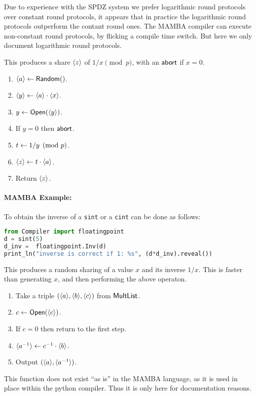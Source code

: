 Due to experience with the SPDZ system we prefer logarithmic
round protocols over constant round protocols, it appears that in
practice the logarithmic round protocols outperform the contant
round ones.
The MAMBA compiler can execute non-constant round protocols, by 
flicking a compile time switch. But here we only document
logarithmic round protocols.


This produces a share $\langle z \rangle$ of $1/x \pmod{p}$, with an
$\mathsf{abort}$ if $x=0$.
\begin{enumerate}
\item $\langle a \rangle \leftarrow \mathsf{Random}()$.
\item $\langle y \rangle \leftarrow \langle a \rangle \cdot \langle x \rangle$.
\item $y \leftarrow {\mathsf{Open}}(\langle y \rangle)$.
\item If $y=0$ then $\mathsf{abort}$.
\item $t \leftarrow 1/y \pmod{p}$.
\item $\langle z \rangle \leftarrow t \cdot \langle a \rangle$.
\item Return $\langle z \rangle$.
\end{enumerate}
\paragraph{MAMBA Example:} To obtain the inverse of a \verb|sint| or a \verb|cint| can be done as follows: 
\begin{lstlisting}[language={python}]
from Compiler import floatingpoint
d = sint(5)
d_inv =  floatingpoint.Inv(d)
print_ln("inverse is correct if 1: %s", (d*d_inv).reveal())
\end{lstlisting}

This produces a random sharing of a value $x$ and its inverse $1/x$.
This is faster than generating $x$, and then performing the above operaton.
\begin{enumerate}
\item Take a triple $(\langle a \rangle,\langle b \rangle,\langle c \rangle)$ from $\mathsf{MultList}$.
\item $c \leftarrow {\mathsf{Open}}(\langle c \rangle)$.
\item If $c=0$ then return to the first step.
\item $\langle a^{-1} \rangle \leftarrow c^{-1} \cdot \langle b \rangle$.
\item Output $(\langle a \rangle,\langle a^{-1} \rangle)$.
\end{enumerate}
This function does not exist ``as is'' in the MAMBA language, as it
is used in place within the python compiler. Thus it is only here
for documentation reasons.


